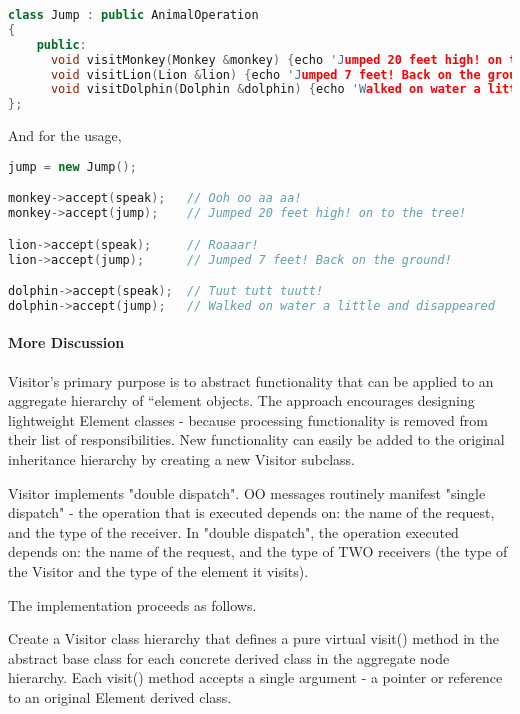\documentclass{book}
\begin{document}
\begin{lstlisting}[caption={visitor pattern sample code 1-2},label={lst:vps2},language=C++]
class Jump : public AnimalOperation
{
    public:
      void visitMonkey(Monkey &monkey) {echo 'Jumped 20 feet high! on to the tree!'; }
      void visitLion(Lion &lion) {echo 'Jumped 7 feet! Back on the ground!'; }
      void visitDolphin(Dolphin &dolphin) {echo 'Walked on water a little and disappeared'; }
};
\end{lstlisting}

And for the usage,

\begin{lstlisting}[caption={visitor pattern sample code 1-3},label={lst:vps1},language=C++]
jump = new Jump();

monkey->accept(speak);   // Ooh oo aa aa!
monkey->accept(jump);    // Jumped 20 feet high! on to the tree!

lion->accept(speak);     // Roaaar!
lion->accept(jump);      // Jumped 7 feet! Back on the ground!

dolphin->accept(speak);  // Tuut tutt tuutt!
dolphin->accept(jump);   // Walked on water a little and disappeared
\end{lstlisting}
\paragraph{More Discussion}

Visitor's primary purpose is to abstract functionality that can be applied to an aggregate hierarchy of ``element objects.
The approach encourages designing lightweight Element classes - because processing functionality is removed from their list of responsibilities.
New functionality can easily be added to the original inheritance hierarchy by creating a new Visitor subclass.

Visitor implements "double dispatch". OO messages routinely manifest "single dispatch" - the operation that is executed depends on: the name of the request, and the type of the receiver.
In "double dispatch", the operation executed depends on: the name of the request, and the type of TWO receivers (the type of the Visitor and the type of the element it visits).

The implementation proceeds as follows. 

Create a Visitor class hierarchy that defines a pure virtual visit() method in the abstract base class for each concrete derived class in the aggregate node hierarchy.
Each visit() method accepts a single argument - a pointer or reference to an original Element derived class.
\end{document}

